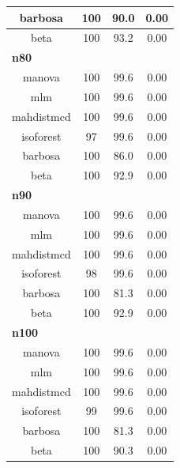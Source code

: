 \documentclass[
]{article}
\begin{document}
\begin{table}
\begin{tabular}[t]{c|c|c|c}
\hline
\hspace{1em}barbosa & 100 & 90.0 & 0.00\\
\hline
\hspace{1em}beta & 100 & 93.2 & 0.00\\
\hline
\multicolumn{4}{l}{\textbf{n80}}\\
\hline
\hspace{1em}manova & 100 & 99.6 & \vphantom{2} 0.00\\
\hline
\hspace{1em}mlm & 100 & 99.6 & \vphantom{2} 0.00\\
\hline
\hspace{1em}mahdistmcd & 100 & 99.6 & \vphantom{2} 0.00\\
\hline
\hspace{1em}isoforest & 97 & 99.6 & 0.00\\
\hline
\hspace{1em}barbosa & 100 & 86.0 & 0.00\\
\hline
\hspace{1em}beta & 100 & 92.9 & \vphantom{1} 0.00\\
\hline
\multicolumn{4}{l}{\textbf{n90}}\\
\hline
\hspace{1em}manova & 100 & 99.6 & \vphantom{1} 0.00\\
\hline
\hspace{1em}mlm & 100 & 99.6 & \vphantom{1} 0.00\\
\hline
\hspace{1em}mahdistmcd & 100 & 99.6 & \vphantom{1} 0.00\\
\hline
\hspace{1em}isoforest & 98 & 99.6 & 0.00\\
\hline
\hspace{1em}barbosa & 100 & 81.3 & \vphantom{1} 0.00\\
\hline
\hspace{1em}beta & 100 & 92.9 & 0.00\\
\hline
\multicolumn{4}{l}{\textbf{n100}}\\
\hline
\hspace{1em}manova & 100 & 99.6 & 0.00\\
\hline
\hspace{1em}mlm & 100 & 99.6 & 0.00\\
\hline
\hspace{1em}mahdistmcd & 100 & 99.6 & 0.00\\
\hline
\hspace{1em}isoforest & 99 & 99.6 & 0.00\\
\hline
\hspace{1em}barbosa & 100 & 81.3 & 0.00\\
\hline
\hspace{1em}beta & 100 & 90.3 & 0.00\\
\hline
\end{tabular}
\end{table}
\end{document}
